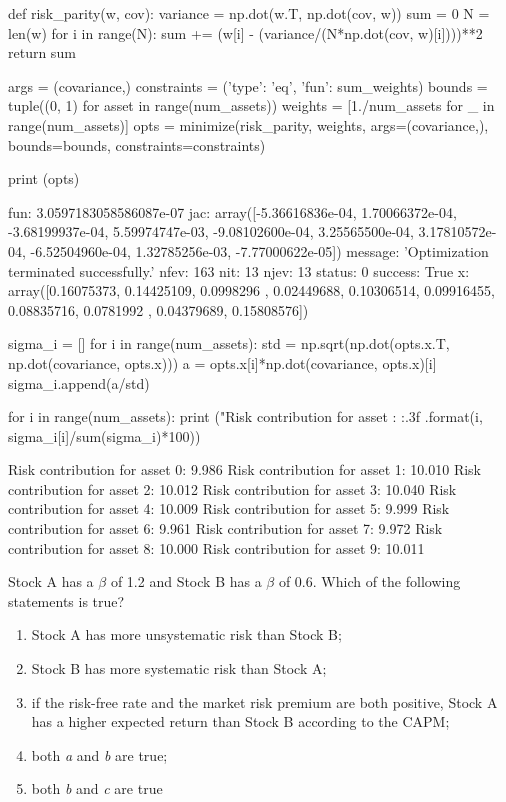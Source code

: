 \cprotEnv \begin{solution}
\begin{ipython}
def risk_parity(w, cov):
    variance = np.dot(w.T, np.dot(cov, w))
    sum = 0 
    N = len(w)
    for i in range(N):
        sum += (w[i] - (variance/(N*np.dot(cov, w)[i])))**2
    return sum

args = (covariance,)
constraints = ({'type': 'eq', 'fun': sum_weights})
bounds = tuple((0, 1) for asset in range(num_assets))
weights = [1./num_assets for _ in range(num_assets)]
opts = minimize(risk_parity, weights, args=(covariance,),
    bounds=bounds, constraints=constraints)

print (opts)

    fun: 3.0597183058586087e-07
    jac: array([-5.36616836e-04,  1.70066372e-04, -3.68199937e-04, 
                 5.59974747e-03, -9.08102600e-04,  3.25565500e-04,  
                 3.17810572e-04, -6.52504960e-04,  1.32785256e-03, 
                -7.77000622e-05])
message: 'Optimization terminated successfully.'
   nfev: 163
    nit: 13
   njev: 13
 status: 0
success: True
      x: array([0.16075373, 0.14425109, 0.0998296 , 0.02449688, 0.10306514,
                0.09916455, 0.08835716, 0.0781992 , 0.04379689, 0.15808576])

sigma_i = []
for i in range(num_assets):
    std = np.sqrt(np.dot(opts.x.T, np.dot(covariance, opts.x)))
    a = opts.x[i]*np.dot(covariance, opts.x)[i]
    sigma_i.append(a/std)

for i in range(num_assets):
    print ("Risk contribution for asset {}: {:.3f}%
        .format(i, sigma_i[i]/sum(sigma_i)*100))
        
Risk contribution for asset 0: 9.986%
Risk contribution for asset 1: 10.010%
Risk contribution for asset 2: 10.012%
Risk contribution for asset 3: 10.040%
Risk contribution for asset 4: 10.009%
Risk contribution for asset 5: 9.999%
Risk contribution for asset 6: 9.961%
Risk contribution for asset 7: 9.972%
Risk contribution for asset 8: 10.000%
Risk contribution for asset 9: 10.011%
\end{ipython}
\end{solution}

\begin{question}
Stock A has a $\beta$ of 1.2 and Stock B has a $\beta$ of 0.6. Which of the following statements is true? 
\begin{enumerate}[label=\emph{\alph*})]
\item Stock A has more unsystematic risk than Stock B;
\item Stock B has more systematic risk than Stock A; 
\item if the risk-free rate and the market risk premium are both positive, Stock A has a higher expected return than Stock B according to the CAPM;
\item both \emph{a} and \emph{b} are true;
\item both \emph{b} and \emph{c} are true
\end{enumerate}

\end{question}

